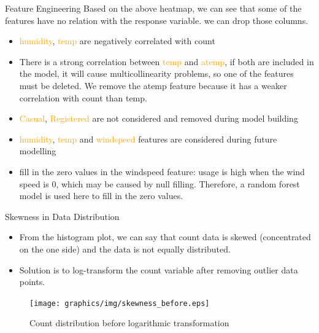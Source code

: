 \documentclass[
 size=14pt,
 paper=smartboard,  %
 mode=present, 		%
 display=slides, 	%
 style=tuliplab,  	%
 pauseslide,
 fleqn,leqno]{powerdot}
\begin{document}
\begin{slide}[toc=,bm=]{Feature Engineering}
Based on the above heatmap, we can see that some of the features have no relation with the response variable. we can drop those columns.
\begin{itemize}
\item
\textcolor{orange} {humidity}, \textcolor{orange}{temp} are negatively correlated with count
\item
There is a strong correlation between \textcolor{orange} {temp} and \textcolor{orange} {atemp}, if both are included in the model, it will cause multicollinearity problems, so one of the features must be deleted. We remove the atemp feature because it has a weaker correlation with count than temp.
\item
\textcolor{orange} {Casual}, \textcolor{orange}{Registered} are not considered and removed during model building 
\item
\textcolor{orange} {humidity}, \textcolor{orange}{temp} and \textcolor{orange} {windspeed} features are considered during future modelling
\item 
fill in the zero values in the windspeed feature: usage is high when the wind speed is 0, which may be caused by null filling. Therefore, a random forest model is used here to fill in the zero values. 
\end{itemize}


\end{slide}




\begin{slide}[toc=,bm=]{ Skewness in Data Distribution}

  \begin{itemize}
  \item From the histogram plot, we can say that count data is skewed (concentrated on the one side) and the data is not equally distributed.
  \item Solution is to log-transform the count variable after removing outlier data points.
  \end{itemize}
  \begin{figure}
    \centering
    \centerline{\texttt{[image: graphics/img/skewness\_before.eps]}}
    \caption{Count distribution before logarithmic transformation}\label{fig:Count distribution before logarithmic transformation}
  \end{figure}
  \end{slide}
\end{document}
